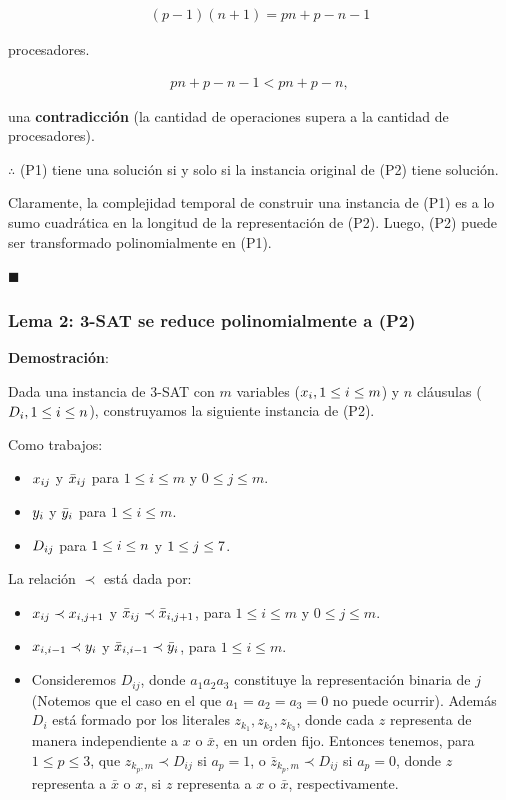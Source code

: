 \documentclass[14pt]{extarticle}
\begin{document}
\begin{align*}
(p - 1)(n + 1) = pn + p - n - 1
\end{align*}

procesadores.

\begin{align*}
pn + p - n - 1 < pn + p - n,
\end{align*}

una \textbf{contradicción} (la cantidad de operaciones supera a la cantidad de procesadores).

$\therefore$ (P1) tiene una solución si y solo si la instancia original de (P2) tiene solución.

Claramente, la complejidad temporal de construir una instancia de (P1) es a lo sumo cuadrática en la longitud de la representación de (P2). Luego, (P2) puede ser transformado polinomialmente en (P1).

$\blacksquare$

\subsubsection*{Lema 2: 3-SAT se reduce polinomialmente a (P2)}

\textbf{Demostración}:

Dada una instancia de 3-SAT con $m$ variables ($x_i, \space 1 \leq i \leq m$) y $n$ cláusulas ($D_i, \space 1 \leq i \leq n$), construyamos la siguiente instancia de (P2).

Como trabajos:

\begin{itemize}
    \item $x_{ij} \space$ y $\space \bar x_{ij}$ para $1 \leq i \leq m$ y $0 \leq j \leq m$.
    \item $y_{i} \space$ y $\space \bar y_{i}$ para $1 \leq i \leq m$.
    \item $D_{ij} \space$ para $\space 1 \leq i \leq n \space$ y $\space 1 \leq j \leq 7$.
\end{itemize}

La relación $\prec$ está dada por:

\begin{itemize}
    \item $x_{ij} \prec x_{i, j+1} \space$ y $\space \bar x_{ij} \prec \bar x_{i, j+1}$, para $1 \leq i \leq m$ y $0 \leq j \leq m$.
    \item $x_{i, i-1} \prec y_{i} \space$ y $\space \bar x_{i, i-1} \prec \bar y_{i}$, para $1 \leq i \leq m$.
    \item Consideremos $D_{ij}$, donde $a_1a_2a_3$ constituye la representación binaria de $j$ (Notemos que el caso en el que $a_1 = a_2 = a_3 = 0$ no puede ocurrir). Además $D_i$ está formado por los literales $z_{k_1}, z_{k_2}, z_{k_3}$, donde cada $z$ representa de manera independiente a $x$ o $\bar x$, en un orden fijo. Entonces tenemos, para $1 \leq p \leq 3$, que $z_{k_p, m} \prec D_{ij}$ si $a_p = 1$, o $\bar z_{k_p, m} \prec D_{ij}$ si $a_p = 0$, donde $z$ representa a $\bar x$ o $x$, si $z$ representa a $x$ o $\bar x$, respectivamente.
\end{itemize}
\end{document}
